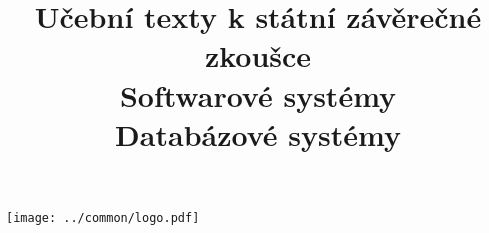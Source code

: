 \clearpage

\clearpage

\title{\LARGE Učební texty k státní závěrečné zkoušce \\ Softwarové systémy \\ Databázové systémy}




\maketitle

\vspace{10mm}
\begin{center}
\texttt{[image: ../common/logo.pdf]}
\end{center} 

\clearpage

\clearpage

\tableofcontents







